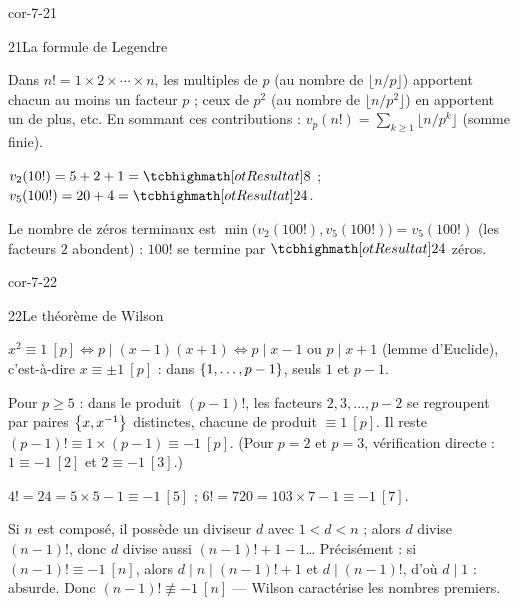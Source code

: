 \begin{blocLivre}{cor-7-21}
\begin{corrige}{21}{La formule de Legendre}
\begin{questions}
  \item Dans $n!=1\times2\times\cdots\times n$, les multiples de $p$
    (au nombre de $\lfloor n/p\rfloor$) apportent chacun au moins un
    facteur $p$ ; ceux de $p^{2}$ (au nombre de $\lfloor n/p^{2}\rfloor$)
    en apportent un de plus, etc. En sommant ces contributions :
    $v_p(n!)=\sum_{k\geq1}\lfloor n/p^{k}\rfloor$ (somme finie).
  \item $v_2(10!)=5+2+1=\res{8}$ ;\quad $v_5(100!)=20+4=\res{24}$.
  \item Le nombre de zéros terminaux est
    $\min\bigl(v_2(100!),v_5(100!)\bigr)=v_5(100!)$ (les facteurs $2$
    abondent) : $100!$ se termine par $\res{24}$ zéros.
\end{questions}
\end{corrige}
\end{blocLivre}

\begin{blocLivre}{cor-7-22}
\begin{corrige}{22}{Le théorème de Wilson}
\begin{questions}
  \item $x^{2}\equiv1\ [p]\iff p\mid(x-1)(x+1)\iff p\mid x-1$ ou
    $p\mid x+1$ (lemme d'Euclide), c'est-à-dire $x\equiv\pm1\ [p]$ : dans
    $\left\{1,\dots,p-1\right\}$, seuls $1$ et $p-1$.
  \item Pour $p\geq5$ : dans le produit $(p-1)!$, les facteurs
    $2,3,\dots,p-2$ se regroupent par paires $\left\{x,x^{-1}\right\}$ distinctes,
    chacune de produit $\equiv1\ [p]$. Il reste
    $(p-1)!\equiv1\times(p-1)\equiv-1\ [p]$. (Pour $p=2$ et $p=3$,
    vérification directe : $1\equiv-1\ [2]$ et $2\equiv-1\ [3]$.)
  \item $4!=24=5\times5-1\equiv-1\ [5]$ ;\quad
    $6!=720=103\times7-1\equiv-1\ [7]$.
  \item Si $n$ est composé, il possède un diviseur $d$ avec $1<d<n$ ;
    alors $d$ divise $(n-1)!$, donc $d$ divise aussi $(n-1)!+1-1$\dots{}
    Précisément : si $(n-1)!\equiv-1\ [n]$, alors $d\mid n\mid(n-1)!+1$ et
    $d\mid(n-1)!$, d'où $d\mid1$ : absurde. Donc
    $(n-1)!\not\equiv-1\ [n]$ — Wilson caractérise les nombres premiers.
\end{questions}
\end{corrige}
\end{blocLivre}

